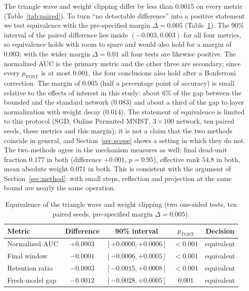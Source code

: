 \documentclass[11pt,a4paper]{article}
\begin{document}
The triangle wave and weight clipping differ by less than $0.0015$ on every metric
(Table~\ref{tab:paired}). To turn ``no detectable difference'' into a positive statement we test equivalence
with the pre-specified margin $\Delta=0.005$ (Table~\ref{tab:tost}). The 90\% interval of the paired difference
lies inside $(-0.003,0.003)$ for all four metrics, so equivalence holds with room to spare and would also hold
for a margin of $0.003$; with the wider margin $\Delta=0.01$ all four tests are likewise positive. The
normalized AUC is the primary metric and the other three are secondary; since every $p_{\mathrm{TOST}}$ is at
most $0.001$, the four conclusions also hold after a Bonferroni correction. The margin of $0.005$ (half a
percentage point of accuracy) is small relative to the effects of interest in this study: about $6\%$ of the
gap between the bounded and the standard network ($0.083$) and about a third of the gap to layer normalization
with weight decay ($0.014$). The statement of equivalence is limited to this protocol (SGD, Online Permuted
MNIST, $3\times100$ network, ten paired seeds, these metrics and this margin); it is not a claim that the two
methods coincide in general, and Section~\ref{sec:scope} shows a setting in which they do not. The two methods agree in the mechanism measures as well: final dead-unit fraction
$0.177$ in both (difference $+0.001$, $p=0.95$), effective rank $54.8$ in both, mean absolute weight $0.071$
in both. This is consistent with the argument of Section~\ref{sec:method}: with small steps, reflection and
projection at the same bound are nearly the same operation.

\begin{table}[t]
  \centering\small
  \caption{Equivalence of the triangle wave and weight clipping (two one-sided tests, ten paired seeds,
  pre-specified margin $\Delta=0.005$).}
  \label{tab:tost}
  \begin{tabular}{@{}lcccc@{}}
    \toprule
    Metric & Difference & 90\% interval & $p_{\mathrm{TOST}}$ & Decision\\
    \midrule
    Normalized AUC   & $+0.0003$ & $[+0.0000,+0.0006]$ & $<0.001$ & equivalent\\
    Final window     & $-0.0001$ & $[-0.0006,+0.0005]$ & $<0.001$ & equivalent\\
    Retention ratio  & $-0.0003$ & $[-0.0015,+0.0008]$ & $<0.001$ & equivalent\\
    Fresh-model gap  & $-0.0012$ & $[-0.0028,+0.0005]$ & $0.001$  & equivalent\\
    \bottomrule
  \end{tabular}
\end{table}
\end{document}
